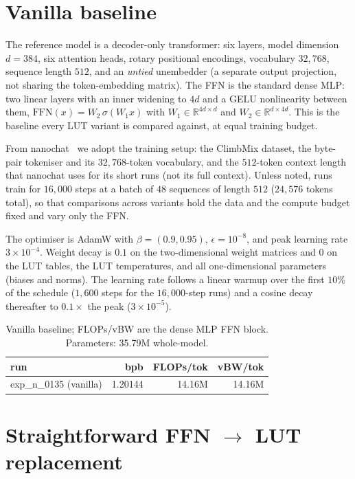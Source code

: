 \documentclass[11pt]{article}
\begin{document}
\section{Vanilla baseline}

The reference model is a decoder-only transformer: six layers, model dimension $d=384$, six
attention heads, rotary positional encodings, vocabulary $32{,}768$, sequence length $512$, and an
\emph{untied} unembedder (a separate output projection, not sharing the token-embedding
matrix). The FFN is the standard dense MLP: two linear layers with an inner widening to $4d$
and a GELU nonlinearity between them, $\mathrm{FFN}(x)=W_2\,\sigma(W_1 x)$ with
$W_1\in\mathbb{R}^{4d\times d}$ and $W_2\in\mathbb{R}^{d\times 4d}$. This is the baseline every
LUT variant is compared against, at equal training budget.

From nanochat~\cite{nanochat} we adopt the training setup: the ClimbMix dataset, the byte-pair
tokeniser and its $32{,}768$-token vocabulary, and the $512$-token context length that nanochat
uses for its short runs (not its full context). Unless noted, runs train for $16{,}000$ steps at
a batch of $48$ sequences of length $512$ ($24{,}576$ tokens total), so that comparisons across
variants hold the data and the compute budget fixed and vary only the FFN.

The optimiser is AdamW with $\beta=(0.9,0.95)$, $\epsilon=10^{-8}$, and peak learning rate
$3\times10^{-4}$. Weight decay is $0.1$ on the two-dimensional weight matrices and $0$ on the
LUT tables, the LUT temperatures, and all one-dimensional parameters (biases and norms). The
learning rate follows a linear warmup over the first $10\%$ of the schedule ($1{,}600$ steps
for the $16{,}000$-step runs) and a cosine decay thereafter to $0.1\times$ the peak
($3\times10^{-5}$).

\begin{table}[h]\centering
\begin{tabular}{lrrr}
\toprule
run & bpb & FLOPs/tok & vBW/tok \\
\midrule
exp\_n\_0135 (vanilla) & 1.20144 & 14.16M & 14.16M \\
\bottomrule
\end{tabular}
\caption{Vanilla baseline; FLOPs/vBW are the dense MLP FFN block. Parameters: 35.79M whole-model.}
\end{table}

\section{Straightforward FFN $\rightarrow$ LUT replacement}
\label{sec:straightforward}
\end{document}
